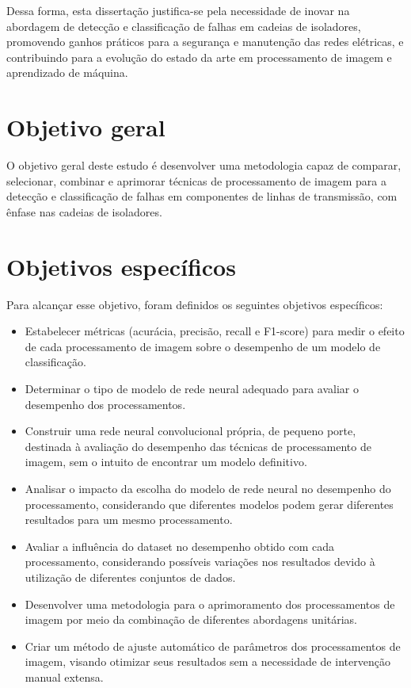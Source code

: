 Dessa forma, esta dissertação justifica-se pela necessidade de inovar na abordagem de detecção e classificação de falhas em cadeias de isoladores, promovendo ganhos práticos para a segurança e manutenção das redes elétricas, e contribuindo para a evolução do estado da arte em processamento de imagem e aprendizado de máquina.

\section{Objetivo geral}

O objetivo geral deste estudo é desenvolver uma metodologia capaz de comparar, selecionar, combinar e aprimorar técnicas de processamento de imagem para a detecção e classificação de falhas em componentes de linhas de transmissão, com ênfase nas cadeias de isoladores.

\section{Objetivos específicos}

Para alcançar esse objetivo, foram definidos os seguintes objetivos específicos:

\begin{itemize}
    \item Estabelecer métricas (acurácia, precisão, recall e F1-score) para medir o efeito de cada processamento de imagem sobre o desempenho de um modelo de classificação.
    \item Determinar o tipo de modelo de rede neural adequado para avaliar o desempenho dos processamentos.
    \item Construir uma rede neural convolucional própria, de pequeno porte, destinada à avaliação do desempenho das técnicas de processamento de imagem, sem o intuito de encontrar um modelo definitivo.
    \item Analisar o impacto da escolha do modelo de rede neural no desempenho do processamento, considerando que diferentes modelos podem gerar diferentes resultados para um mesmo processamento.
    \item Avaliar a influência do dataset no desempenho obtido com cada processamento, considerando possíveis variações nos resultados devido à utilização de diferentes conjuntos de dados.
    \item Desenvolver uma metodologia para o aprimoramento dos processamentos de imagem por meio da combinação de diferentes abordagens unitárias.
    \item Criar um método de ajuste automático de parâmetros dos processamentos de imagem, visando otimizar seus resultados sem a necessidade de intervenção manual extensa.
\end{itemize}

